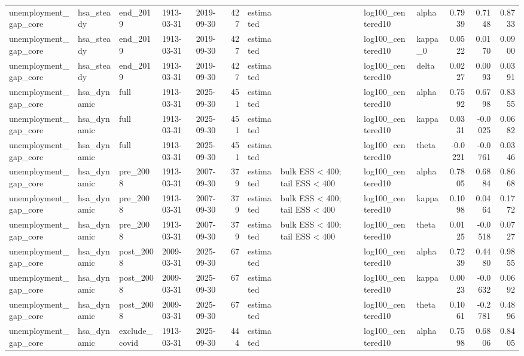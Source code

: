 \begin{tabular}{lllllrllllrrr}
unemployment\_gap\_core & hsa\_steady & end\_2019 & 1913-03-31 & 2019-09-30 & 427 & estimated &  & log100\_centered10 & alpha & 0.7939 & 0.7148 & 0.8733 \\
unemployment\_gap\_core & hsa\_steady & end\_2019 & 1913-03-31 & 2019-09-30 & 427 & estimated &  & log100\_centered10 & kappa\_0 & 0.0522 & 0.0170 & 0.0900 \\
unemployment\_gap\_core & hsa\_steady & end\_2019 & 1913-03-31 & 2019-09-30 & 427 & estimated &  & log100\_centered10 & delta & 0.0227 & 0.0093 & 0.0391 \\
unemployment\_gap\_core & hsa\_dynamic & full & 1913-03-31 & 2025-09-30 & 451 & estimated &  & log100\_centered10 & alpha & 0.7592 & 0.6798 & 0.8355 \\
unemployment\_gap\_core & hsa\_dynamic & full & 1913-03-31 & 2025-09-30 & 451 & estimated &  & log100\_centered10 & kappa & 0.0331 & -0.0025 & 0.0682 \\
unemployment\_gap\_core & hsa\_dynamic & full & 1913-03-31 & 2025-09-30 & 451 & estimated &  & log100\_centered10 & theta & -0.0221 & -0.0761 & 0.0346 \\
unemployment\_gap\_core & hsa\_dynamic & pre\_2008 & 1913-03-31 & 2007-09-30 & 379 & estimated & bulk ESS < 400; tail ESS < 400 & log100\_centered10 & alpha & 0.7805 & 0.6884 & 0.8668 \\
unemployment\_gap\_core & hsa\_dynamic & pre\_2008 & 1913-03-31 & 2007-09-30 & 379 & estimated & bulk ESS < 400; tail ESS < 400 & log100\_centered10 & kappa & 0.1098 & 0.0464 & 0.1772 \\
unemployment\_gap\_core & hsa\_dynamic & pre\_2008 & 1913-03-31 & 2007-09-30 & 379 & estimated & bulk ESS < 400; tail ESS < 400 & log100\_centered10 & theta & 0.0125 & -0.0518 & 0.0727 \\
unemployment\_gap\_core & hsa\_dynamic & post\_2008 & 2009-03-31 & 2025-09-30 & 67 & estimated &  & log100\_centered10 & alpha & 0.7239 & 0.4480 & 0.9855 \\
unemployment\_gap\_core & hsa\_dynamic & post\_2008 & 2009-03-31 & 2025-09-30 & 67 & estimated &  & log100\_centered10 & kappa & 0.0023 & -0.0632 & 0.0692 \\
unemployment\_gap\_core & hsa\_dynamic & post\_2008 & 2009-03-31 & 2025-09-30 & 67 & estimated &  & log100\_centered10 & theta & 0.1061 & -0.2781 & 0.4896 \\
unemployment\_gap\_core & hsa\_dynamic & exclude\_covid & 1913-03-31 & 2025-09-30 & 444 & estimated &  & log100\_centered10 & alpha & 0.7598 & 0.6806 & 0.8405 \\

\end{tabular}
